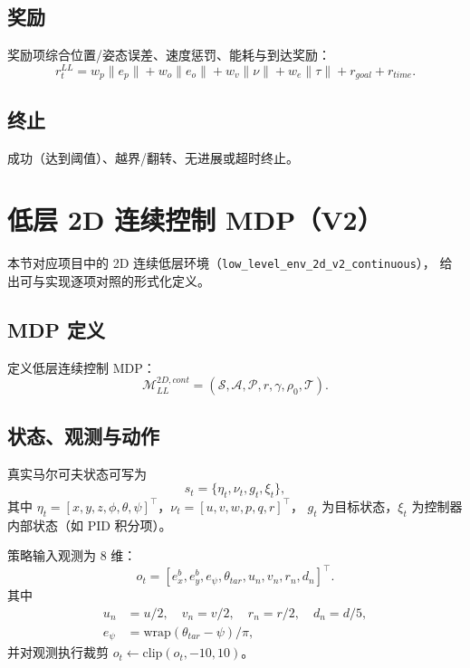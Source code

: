 \documentclass[11pt]{article}
\begin{document}
\subsection*{奖励}
奖励项综合位置/姿态误差、速度惩罚、能耗与到达奖励：
\begin{equation}
 r_t^{LL} = w_p\|e_p\| + w_o\|e_o\| + w_v\|\nu\| + w_e\|\tau\| + r_{goal} + r_{time}.
\end{equation}

\subsection*{终止}
成功（达到阈值）、越界/翻转、无进展或超时终止。

\section{低层 2D 连续控制 MDP（V2）}
本节对应项目中的 2D 连续低层环境（\texttt{low\_level\_env\_2d\_v2\_continuous}），
给出可与实现逐项对照的形式化定义。

\subsection*{MDP 定义}
定义低层连续控制 MDP：
\begin{equation}
\mathcal{M}_{LL}^{2D,cont}=(\mathcal{S},\mathcal{A},\mathcal{P},r,\gamma,\rho_0,\mathcal{T}).
\end{equation}

\subsection*{状态、观测与动作}
真实马尔可夫状态可写为
\begin{equation}
s_t=\{\eta_t,\nu_t,g_t,\xi_t\},
\end{equation}
其中 $\eta_t=[x,y,z,\phi,\theta,\psi]^\top$，$\nu_t=[u,v,w,p,q,r]^\top$，
$g_t$ 为目标状态，$\xi_t$ 为控制器内部状态（如 PID 积分项）。

策略输入观测为 8 维：
\begin{equation}
o_t=[e_x^b,e_y^b,e_\psi,\theta_{tar},u_n,v_n,r_n,d_n]^\top.
\end{equation}
其中
\begin{align}
u_n &= u/2,\quad v_n=v/2,\quad r_n=r/2,\quad d_n=d/5,\\
e_\psi &= \mathrm{wrap}(\theta_{tar}-\psi)/\pi,
\end{align}
并对观测执行裁剪 $o_t\leftarrow\mathrm{clip}(o_t,-10,10)$。
\end{document}
